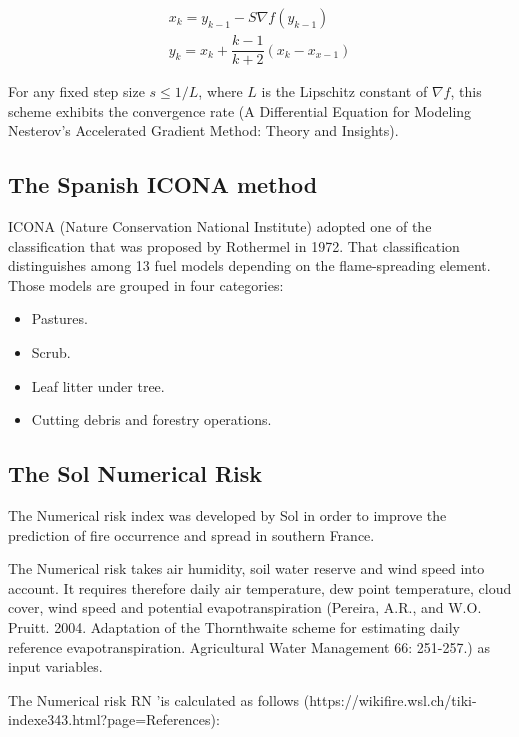 {{	\begin{equation}
		\begin{aligned}
			x_{k} = y_{k-1} - S\nabla f(y_{k-1})\\
			y_{k} = x_{k} + \dfrac{k-1}{k+2}(x_{k} - x_{x-1})
		\end{aligned}
	\end{equation}

	For any fixed step size $s \le 1/L$, where $L$ is the Lipschitz constant of $\nabla f$, this scheme exhibits the convergence rate (A Differential Equation for Modeling Nesterov’s Accelerated Gradient Method: Theory and Insights).
	
	\subsection{The Spanish ICONA method}
	
	ICONA (Nature Conservation National Institute) adopted one of the classification that was proposed by Rothermel in 1972. That classification distinguishes among 13 fuel models depending on the flame-spreading element. Those models are grouped in four categories:
	
	\begin{itemize}
		\item Pastures.
		\item Scrub.
		\item Leaf litter under tree.
		\item Cutting debris and forestry operations.
	\end{itemize}
	
	\subsection{The Sol Numerical Risk}
	
	The Numerical risk index was developed by Sol in order to improve the prediction of fire occurrence and spread in southern France.
	
	The Numerical risk takes air humidity, soil water reserve and wind speed into account. It requires therefore daily air temperature, dew point temperature, cloud cover, wind speed and potential evapotranspiration (Pereira, A.R., and W.O. Pruitt. 2004. Adaptation of the Thornthwaite scheme for estimating daily reference evapotranspiration. Agricultural Water Management 66: 251-257.) as input variables.
	
	The Numerical risk RN 'is calculated as follows (https://wikifire.wsl.ch/tiki-indexe343.html?page=References):
	
}}
